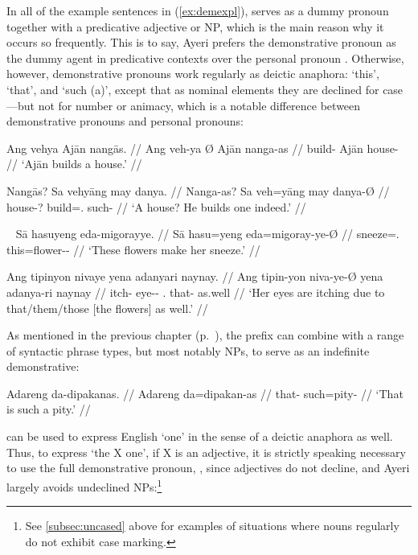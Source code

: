 \xe


In all of the example sentences in (\ref{ex:demexpl}), 
 serves as a dummy pronoun together with a 
predicative adjective or NP, which is the main reason why it occurs so 
frequently. This is to say, Ayeri prefers the demonstrative pronoun 
 as the dummy agent in predicative contexts over the 
personal pronoun . Otherwise, however, demonstrative 
pronouns work regularly as deictic anaphora: `this', `that', and `such (a)', 
except that as nominal elements they are declined for case---but not for number 
or animacy, which is a notable difference between demonstrative pronouns and 
personal pronouns:

\pex
\a\begingl
	\gla Ang vehya {} Ajān nangās. //
	\glb Ang veh-ya Ø Ajān nanga-as //
	\glc \AgtT{} build-\TsgM{} \Top{} Ajān house-\Parg{} //
	\glft `Ajān builds a house.' //
\endgl

\a\begingl
	\gla Nangās? Sa vehyāng may danya. //
	\glb Nanga-as? Sa veh=yāng may danya-Ø //
	\glc house-\Parg{}? \PatT{} build=\TsgM{}.\Aarg{} \Aff{} such-\Top{} //
	\glft `A house? He builds one indeed.' //
\endgl

\xe

\pex~
\a\begingl
	\gla Sā hasuyeng eda-migorayye. //
	\glb Sā hasu=yeng eda=migoray-ye-Ø //
	\glc \CauT{} sneeze=\TsgF{}.\Aarg{} this=flower-\Pl{}-\Top{} //
	\glft `These flowers make her sneeze.' //
\endgl

\a\begingl
	\gla Ang tipinyon nivaye yena adanyari naynay. //
	\glb Ang tipin-yon niva-ye-Ø yena adanya-ri naynay //
	\glc \AgtT{} itch-\TplN{} eye-\Pl{}-\Top{} \TsgF{}.\Gen{} that-\Caus{} 
		as.well //
	\glft `Her eyes are itching due to that/them/those [the flowers] as 
		well.' //
\endgl
\xe

As mentioned in the previous chapter (p.~\pageref{nounprefixes}), the prefix 
 can combine with a range of syntactic phrase types, 
but most notably NPs, to serve as an indefinite demonstrative:

\ex\begingl
	\gla Adareng da-dipakanas. //
	\glb Adareng da=dipakan-as //
	\glc that-\AargI{} such=pity-\Parg{} //
	\glft `That is such a pity.' //
\endgl\xe

 can be used to express English `one' in the sense of a deictic 
anaphora as well. Thus, to express `the X one', if X is an adjective, it is 
strictly speaking necessary to use the full demonstrative pronoun, 
, since adjectives do not decline, and Ayeri largely avoids 
undeclined NPs:\footnote{See \autoref{subsec:uncased} above for examples of 
situations where nouns regularly do not exhibit case marking.}

